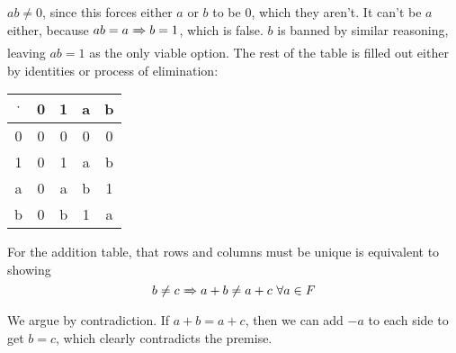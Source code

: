 \documentclass[12pt]{article}
\newcommand{\ra}{\xRightarrow}
\begin{document}
$ab \ne 0$, since this forces either $a$ or $b$ to be
$0$, which they aren't.
It can't be $a$ either, because $ab=a \ra\  b=1$, which is false.
$b$ is banned by similar reasoning, leaving $ab=1$ as the only viable option.
The rest of the table is filled out either by identities or process of elimination:
\begin{center}
      \begin{tabular}{ c|c|c|c|c }
            $\cdot$ & 0 & 1 & a & b \\ \hline
            0       & 0 & 0 & 0 & 0 \\ \hline
            1       & 0 & 1 & a & b \\ \hline
            a       & 0 & a & b & 1 \\ \hline
            b       & 0 & b & 1 & a
      \end{tabular}
\end{center}

For the addition table, that rows and columns must be unique is equivalent
to showing
\[b \ne c \ra\  a+b \ne a+c\ \forall a \in F\]
We argue by contradiction.
If $a+b=a+c$, then we can add $-a$ to each side to get $b=c$,
which clearly contradicts the premise.
\end{document}
